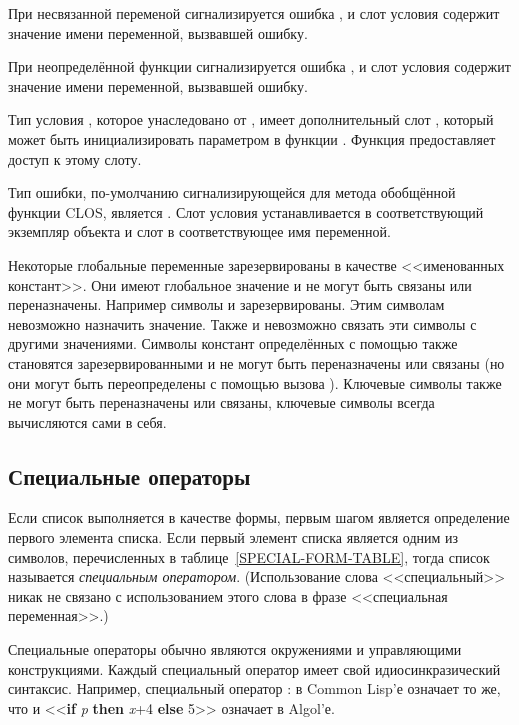 При несвязанной переменой сигнализируется ошибка , и
слот  условия  содержит значение имени
переменной, вызвавшей ошибку.

При неопределённой функции сигнализируется ошибка , и
слот  условия  содержит значение имени
переменной, вызвавшей ошибку.

Тип условия , которое унаследовано от ,
имеет дополнительный слот , который может быть инициализировать
параметром  в функции .
Функция  предоставляет доступ к этому слоту.

Тип ошибки, по-умолчанию сигнализирующейся для метода обобщённой функции
 CLOS, является .
Слот  условия  устанавливается в
соответствующий экземпляр объекта и слот  в соответствующее имя
переменной.

Некоторые глобальные переменные зарезервированы в качестве <<именованных
констант>>.
Они имеют глобальное значение и не могут быть связаны или переназначены.
Например символы {\true} и {\false} зарезервированы.
Этим символам невозможно назначить значение. Также и невозможно связать эти
символы с другими значениями. Символы констант определённых с помощью
 также становятся зарезервированными и не могут быть
переназначены или связаны (но они могут быть переопределены с помощью вызова
). Ключевые символы также не могут быть переназначены или
связаны, ключевые символы всегда вычисляются сами в себя.

\subsection{Специальные операторы}

Если список выполняется в качестве формы, первым шагом является определение
первого элемента списка. Если первый элемент списка является одним из символов,
перечисленных в таблице~\ref{SPECIAL-FORM-TABLE}, тогда список называется
\emph{специальным оператором}. (Использование слова <<специальный>> никак не
связано с использованием этого слова в фразе <<специальная переменная>>.)

Специальные операторы обычно являются окружениями и управляющими конструкциями.
Каждый специальный оператор имеет свой идиосинкразический синтаксис. Например,
специальный оператор :
 в Common Lisp'е означает то же, что и
<<\textbf{if} \emph{p} \textbf{then} \emph{x}+4 \textbf{else} 5>> означает в
Algol'е.

